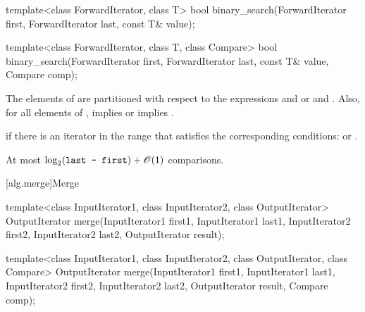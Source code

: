 %
\begin{itemdecl}
template<class ForwardIterator, class T>
  bool binary_search(ForwardIterator first, ForwardIterator last,
                     const T& value);

template<class ForwardIterator, class T, class Compare>
  bool binary_search(ForwardIterator first, ForwardIterator last,
                     const T& value, Compare comp);
\end{itemdecl}

\begin{itemdescr}
\pnum
\requires
The elements
of
are partitioned with respect to the expressions
and
or
and
.
Also, for all elements
of
\tcode{[first, last)},
implies
or
implies
.

\pnum
\returns
{}
if there is an iterator
in the range
that satisfies the corresponding conditions:
or
.

\pnum
\complexity
At most
$\log_2(\texttt{last - first}) + \mathscr{O}(1)$
comparisons.
\end{itemdescr}

[alg.merge]{Merge}

%
\begin{itemdecl}
template<class InputIterator1, class InputIterator2,
         class OutputIterator>
  OutputIterator
    merge(InputIterator1 first1, InputIterator1 last1,
          InputIterator2 first2, InputIterator2 last2,
          OutputIterator result);

template<class InputIterator1, class InputIterator2,
         class OutputIterator, class Compare>
  OutputIterator
    merge(InputIterator1 first1, InputIterator1 last1,
          InputIterator2 first2, InputIterator2 last2,
          OutputIterator result, Compare comp);
\end{itemdecl}

